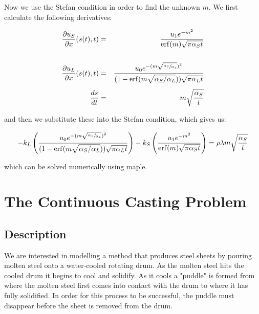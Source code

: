 \documentclass{report}
\DeclareMathOperator{\erf}{erf}
\begin{document}
Now we use the Stefan condition in order to find the unknown $m$. We first calculate the following derivatives:\bigskip

\begin{eqnarray*}
\frac{\partial u_S}{\partial x}(s(t), t) & = & \frac{u_1 e^{-m^2}}{\erf(m) \sqrt{\pi \alpha_S t}} \\\\
\frac{\partial u_L}{\partial x}(s(t), t) & = & \frac{u_0 e^{-( m \sqrt{\sfrac{\alpha_S}{\alpha_L}} )^2}}{( 1 - \erf ( m \sqrt{ \alpha_S / \alpha_L} ) ) \sqrt{\pi \alpha_L t}} \\\\
\frac{d s}{d t} & = & m \sqrt{\frac{\alpha_S}{t}}
\end{eqnarray*}\medskip

and then we substitute these into the Stefan condition, which gives us:\bigskip

\[
- k_L \left( \frac{u_0 e^{-( m \sqrt{\sfrac{\alpha_S}{\alpha_L}} )^2}}{( 1 - \erf ( m \sqrt{ \alpha_S / \alpha_L} ) ) \sqrt{\pi \alpha_L t}} \right) - k_S \left( \frac{u_1 e^{-m^2}}{\erf(m) \sqrt{\pi \alpha_S t}} \right) = \rho \lambda m \sqrt{\frac{\alpha_S}{t}}
\]\medskip

which can be solved numerically using maple.
















\chapter{The Continuous Casting Problem}



\section{Description}

We are interested in modelling a method that produces steel sheets by pouring molten steel onto a 
water-cooled rotating drum. As the molten steel hits the cooled drum it begins to cool and solidify. As it 
cools a "puddle" is formed from where the molten steel first comes into contact with the drum to where it 
has fully solidified. In order for this process to be successful, the puddle must disappear before the 
sheet is removed from the drum.\bigskip
\end{document}
